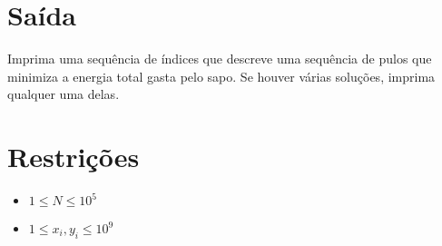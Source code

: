 \section*{Saída}

Imprima uma sequência de índices que descreve uma sequência de pulos que minimiza a energia total gasta pelo sapo. Se houver várias soluções, imprima qualquer uma delas.

\section*{Restrições}

\begin{itemize}
\item $ 1 \leq N \leq 10^5$
\item $1 \leq x_i, y_i \leq 10^9$
\end{itemize}


\exemplo
